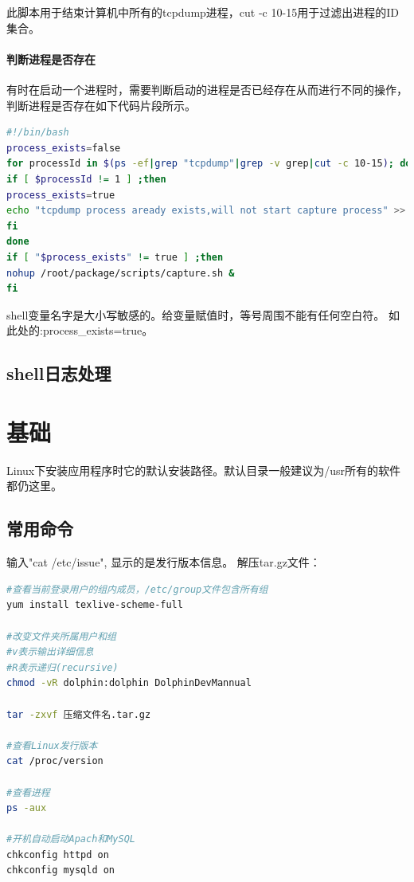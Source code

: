 \documentclass{book}
\begin{document}
此脚本用于结束计算机中所有的tcpdump进程，cut -c 10-15用于过滤出进程的ID集合。

\paragraph{判断进程是否存在}

有时在启动一个进程时，需要判断启动的进程是否已经存在从而进行不同的操作，
判断进程是否存在如下代码片段所示。

\begin{lstlisting}[language=Bash]
#!/bin/bash
process_exists=false
for processId in $(ps -ef|grep "tcpdump"|grep -v grep|cut -c 10-15); do
if [ $processId != 1 ] ;then
process_exists=true
echo "tcpdump process aready exists,will not start capture process" >> ./log/capture.log
fi
done
if [ "$process_exists" != true ] ;then
nohup /root/package/scripts/capture.sh &
fi
\end{lstlisting}

shell变量名字是大小写敏感的。给变量赋值时，等号周围不能有任何空白符。
如此处的:process\_exists=true。

\subsection{shell日志处理}

\section{基础}

Linux下安装应用程序时它的默认安装路径。默认目录一般建议为/usr所有的软件都仍这里。

\subsection{常用命令}

输入"cat /etc/issue", 显示的是发行版本信息。
解压tar.gz文件：

\begin{lstlisting}[language=Bash]
#查看当前登录用户的组内成员，/etc/group文件包含所有组
yum install texlive-scheme-full

#改变文件夹所属用户和组
#v表示输出详细信息
#R表示递归(recursive)
chmod -vR dolphin:dolphin DolphinDevMannual

tar -zxvf 压缩文件名.tar.gz

#查看Linux发行版本
cat /proc/version

#查看进程
ps -aux

#开机自动启动Apach和MySQL
chkconfig httpd on
chkconfig mysqld on
\end{lstlisting}
\end{document}
